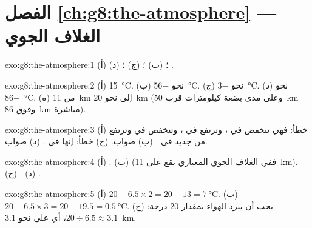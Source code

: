 \section*{الفصل \ref{ch:g8:the-atmosphere} --- الغلاف الجوي}

\begin{solution}{exo:g8:the-atmosphere:1}
(أ) ؛ (ب) ؛ (ج) ؛ (د) .
\end{solution}

\begin{solution}{exo:g8:the-atmosphere:2}
(أ) \qty{15}{\degreeCelsius}. (ب) نحو \qty{-56}{\degreeCelsius}.
(ج) نحو \qty{-3}{\degreeCelsius}. (د) نحو \qty{-86}{\degreeCelsius}.
(ه) من \qty{11}{km} إلى نحو \qty{20}{km} (وعلى مدى بضعة كيلومترات
قرب \qty{50}{km} وفوق \qty{86}{km} مباشرة).
\end{solution}

\begin{solution}{exo:g8:the-atmosphere:3}
(أ) خطأ: فهي تنخفض في ، وترتفع في ، وتنخفض في
 وترتفع من جديد في . (ب) صواب.
(ج) خطأ: إنها في . (د) صواب.
\end{solution}

\begin{solution}{exo:g8:the-atmosphere:4}
(أ) . (ب)  (ففي الغلاف الجوي المعياري يقع
 على  \qty{11}{km}). (ج) . (د) .
\end{solution}

\begin{solution}{exo:g8:the-atmosphere:5}
(أ) $20 - 6.5 \times 2 = 20 - 13 = \qty{7}{\degreeCelsius}$. (ب) $20 -
6.5 \times 3 = 20 - 19.5 = \qty{0.5}{\degreeCelsius}$. (ج) يجب أن يبرد
الهواء بمقدار 20 درجة: $20 \div 6.5 \approx 3.1$، أي على  نحو
\qty{3.1}{km}.
\end{solution}

